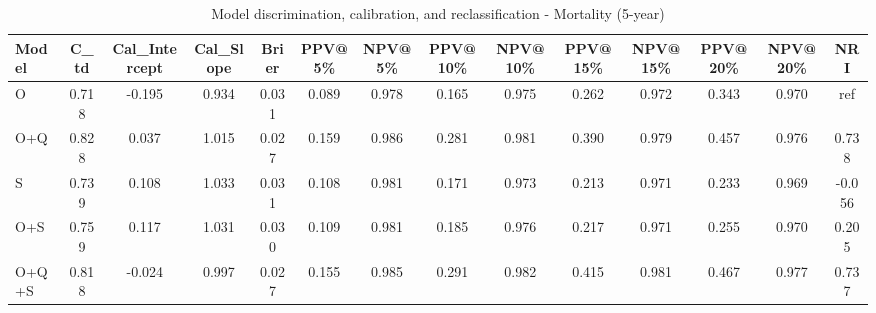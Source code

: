 \begin{table}[htbp]
\centering
\small
\caption{Model discrimination, calibration, and reclassification - Mortality (5-year)}
\label{tab:perf_mortality_5y}
\begin{tabular}{lccccccccccccc}
\toprule
Model & C\_td & Cal\_Intercept & Cal\_Slope & Brier & PPV@5\% & NPV@5\% & PPV@10\% & NPV@10\% & PPV@15\% & NPV@15\% & PPV@20\% & NPV@20\% & NRI \\
\midrule
O & 0.718 & -0.195 & 0.934 & 0.031 & 0.089 & 0.978 & 0.165 & 0.975 & 0.262 & 0.972 & 0.343 & 0.970 & ref \\
O+Q & 0.828 & 0.037 & 1.015 & 0.027 & 0.159 & 0.986 & 0.281 & 0.981 & 0.390 & 0.979 & 0.457 & 0.976 & 0.738 \\
S & 0.739 & 0.108 & 1.033 & 0.031 & 0.108 & 0.981 & 0.171 & 0.973 & 0.213 & 0.971 & 0.233 & 0.969 & -0.056 \\
O+S & 0.759 & 0.117 & 1.031 & 0.030 & 0.109 & 0.981 & 0.185 & 0.976 & 0.217 & 0.971 & 0.255 & 0.970 & 0.205 \\
O+Q+S & 0.818 & -0.024 & 0.997 & 0.027 & 0.155 & 0.985 & 0.291 & 0.982 & 0.415 & 0.981 & 0.467 & 0.977 & 0.737 \\
\bottomrule
\end{tabular}
\end{table}